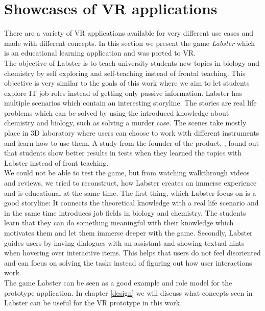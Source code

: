 \section{Showcases of VR applications}
\label{labster}
There are a variety of VR applications available for very different use cases and made with different concepts. In this section we present the game \textit{Labster} which is an educational learning application and was ported to VR.\\
The objective of Labster is to teach university students new topics in biology and chemistry by self exploring and self-teaching instead of frontal teaching. This objective is very similar to the goals of this work where we aim to let students explore IT job roles instead of getting only passive information. Labster has multiple scenarios which contain an interesting storyline. The stories are real life problems which can be solved by using the introduced knowledge about chemistry and biology, such as solving a murder case. The scenes take mostly place in 3D laboratory where users can choose to work with different instruments and learn how to use them. A study from the founder of the product, , found out that students show better results in tests when they learned the topics with Labster instead of front teaching. \cite{Bodekaer.October2015} \\
We could not be able to test the game, but from watching walkthrough videos and reviews, we tried to reconstruct, how Labster creates an immerse experience and is educational at the same time.
The first thing, which Labster focus on is a good storyline: It connects the theoretical knowledge with a real life scenario and in the same time introduces job fields in biology and chemistry. The students learn that they can do something meaningful with their knowledge which motivates them and let them immerse deeper with the game. Secondly, Labster guides users by having dialogues with an assistant and showing textual hints when hovering over interactive items. This helps that users do not feel disoriented and can focus on solving the tasks instead of figuring out how user interactions work.\\
The game Labster can be seen as a good example and role model for the prototype application. In chapter \ref{design} we will discuss what concepts seen in Labster can be useful for the VR prototype in this work.
